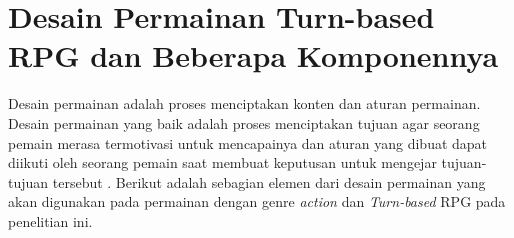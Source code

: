 \section{Desain Permainan Turn-based RPG dan Beberapa Komponennya}
\label{sec:sec2_gdd}
\vspace{1ex}

Desain permainan adalah proses menciptakan konten dan aturan permainan. Desain permainan yang baik adalah proses menciptakan tujuan agar seorang pemain merasa termotivasi untuk mencapainya dan aturan yang dibuat dapat diikuti oleh seorang pemain saat membuat keputusan untuk mengejar tujuan-tujuan tersebut \citep{Brathwaite2009}. Berikut adalah sebagian elemen dari desain permainan yang akan digunakan pada permainan dengan genre \textit{action} dan \textit{Turn-based} RPG pada penelitian ini.
\vspace{1ex}

